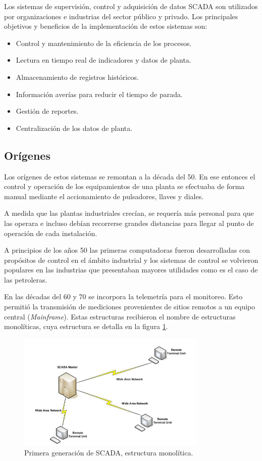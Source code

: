 Los sistemas de supervisión, control y adquisición de datos SCADA son utilizados por organizaciones e industrias del sector público y privado.
Los principales objetivos y beneficios de la implementación de estos sistemas son: 

\begin{itemize}
	\item Control y mantenimiento de la eficiencia de los procesos.
	\item Lectura en tiempo real de indicadores y datos de planta.
	\item Almacenamiento de registros históricos.
	\item Información averías para reducir el tiempo de parada. 
	\item Gestión de reportes.
	\item Centralización de los datos de planta.
\end{itemize}

\subsection{Orígenes}

Los orígenes de estos sistemas se remontan a la década del 50. En ese entonces el control y operación de los equipamientos de una planta se efectuaba de forma manual mediante el accionamiento de pulsadores, llaves y diales.

A medida que las plantas industriales crecían, se requería más personal para que las operara e incluso debían recorrerse grandes distancias para llegar al punto de operación de cada instalación.

A principios de los años 50 las primeras computadoras fueron desarrolladas con propósitos de control en el ámbito industrial y los sistemas de control se volvieron populares en las industrias que presentaban mayores utilidades como es el caso de las petroleras.

En las décadas del 60 y 70 se incorpora la telemetría para el monitoreo. Esto permitió la transmisión de mediciones provenientes de sitios remotos a un equipo central (\textit{Mainframe}). Estas estructuras recibieron el nombre de estructuras monolíticas, cuya estructura se detalla en la figura \ref{fig:SCMON}.

\begin{figure}[htbp]
	\centering
	\includegraphics[width=0.8\textwidth]{./Figures/SCADA_MONOLITICO.png }
	\caption{Primera generación de SCADA, estructura monolítica.\citep{BOOK:2}}
	\label{fig:SCMON}
\end{figure}

